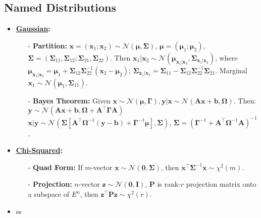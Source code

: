 \documentclass[9pt, landscape]{article}
\begin{document}
\begin{multicols*}{3}
\subsection{Named Distributions}
\begin{itemize}
	\item \textbf{\href{https://en.wikipedia.org/wiki/Normal_distribution}{Gaussian}:}
	\begin{itemize}[leftmargin=10pt,noitemsep,topsep=0pt,partopsep=0pt]
		\item[-] \textbf{Partition:} $\bm{x} = (\bm{x}_1; \bm{x}_2) \sim \mathcal{N}(\bm{\mu}, \bm{\Sigma})$, $\bm{\mu}= (\bm{\mu}_1; \bm{\mu}_2)$, $\bm{\Sigma} = (\bm{\Sigma}_{11}, \bm{\Sigma}_{12}; \bm{\Sigma}_{21}, \bm{\Sigma}_{22})$. Then $\bm{x}_1 | \bm{x}_2 \sim \mathcal{N}(\bm{\mu}_{\bm{x}_1|\bm{x}_2}, \bm{\Sigma}_{\bm{x}_1|\bm{x}_2})$, where $\bm{\mu}_{\bm{x}_1|\bm{x}_2} = \bm{\mu}_1 + \bm{\Sigma}_{12} \bm{\Sigma}_{22}^{-1} (\bm{x}_2 - \bm{\mu}_2)$; $\bm{\Sigma}_{\bm{x}_1|\bm{x}_2} = \bm{\Sigma}_{11}-\bm{\Sigma}_{12} \bm{\Sigma}_{22}^{-1} \bm{\Sigma}_{21}$. Marginal $\bm{x}_1 \sim \mathcal{N}(\bm{\mu}_1, \bm{\Sigma}_{11})$.
		\item[-] \textbf{Bayes Theorem:} Given $\bm{x}\sim \mathcal{N}(\bm{\mu}, \bm{\Gamma}), \bm{y}|\bm{x} \sim \mathcal{N}(\bm{A}\bm{x}+\bm{b}, \bm{\Omega})$. Then: $\bm{y}\sim \mathcal{N}(\bm{Ax}+\bm{b}, \bm{\Omega} + \bm{A}^{\top} \bm{\Gamma} \bm{A})$ \\
		$\bm{x}|\bm{y} \sim \mathcal{N}(\bm{\Sigma}[\bm{A}^{\top} \bm{\Omega}^{-1}(\bm{y}-\bm{b}) + \bm{\Gamma}^{-1}\bm{\mu}], \bm{\Sigma} )$, $\bm{\Sigma} = (\bm{\Gamma}^{-1} + \bm{A}^{\top} \bm{\Omega}^{-1} \bm{A})^{-1}$.
	\end{itemize}
	\item \textbf{\href{https://en.wikipedia.org/wiki/Chi-squared_distribution}{Chi-Squared}:}
	\begin{itemize}[leftmargin=10pt,noitemsep,topsep=0pt,partopsep=0pt]
		\item[-] \textbf{Quad Form:} If $m$-vector $\bm{x}\sim \mathcal{N}(\bm{0}, \bm{\Sigma})$, then $\bm{x}^{\top} \bm{\Sigma}^{-1} \bm{x} \sim \chi^2(m)$.
		\item[-] \textbf{Projection:} $n$-vector $\bm{z}\sim \mathcal{N}(\bm{0}, \bm{I})$, $\bm{P}$ is rank-$r$ projection matrix onto a subspace of $E^n$, then $\bm{z}^{\top} \bm{P} \bm{z} \sim \chi^2(r)$.
	\end{itemize}
	\item ss
\end{itemize}


\end{multicols*}
\end{document}
